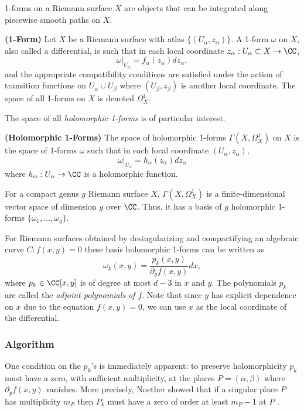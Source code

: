 1-forms on a Riemann surface $X$ are objects that can be integrated
along piecewise smooth paths on $X$.
\begin{definition}
  {\bf (1-Form)} Let $X$ be a Riemann surface with atlas $\{ (U_\alpha,
  z_\alpha) \}$. A 1-form $\omega$ on $X$, also called a differential,
  is such that in each local coordinate $z_\alpha : U_\alpha \subset X
  \to \CC$,
  \[
      \omega \Big|_{U_\alpha} = f_\alpha(z_\alpha) dz_\alpha,
  \]
  and the appropriate compatibility conditions are satisfied under the
  action of transition functions on $U_\alpha \cup U_\beta$ where
  $(U_\beta, z_\beta)$ is another local coordinate. The space of all
  1-forms on $X$ is denoted $\Omega_X^1$.
\end{definition}
The space of all {\it holomorphic 1-forms} is of particular interest.
\begin{definition}
  {\bf (Holomorphic 1-Forms)} The space of holomorphic 1-forms
  $\Gamma(X,\Omega_X^1)$ on $X$ is the space of 1-forms $\omega$ such
  that in each local coordinate $(U_\alpha, z_\alpha)$,
  \[
      \omega \Big|_{U_\alpha} = h_\alpha(z_\alpha) dz_\alpha
  \]
  where $h_\alpha : U_\alpha \to \CC$ is a holomorphic function.
\end{definition}
For a compact genus $g$ Riemann surface $X$, $\Gamma(X,\Omega_X^1)$ is a
finite-dimensional vector space of dimension $g$ over $\CC$. Thus, it
has a basis of $g$ holomorphic 1-forms $\{\omega_1, \ldots, \omega_g\}$.

For Riemann surfaces obtained by desingularizing and compactifying an
algebraic curve $C : f(x,y) = 0$ these basis holomorphic 1-forms can be
written as
\begin{equation*}
  \omega_k(x,y) = \frac{p_k(x,y)}{\partial_y f(x,y)} dx,
\end{equation*}
where $p_k \in \CC[x,y]$ is of degree at most $d-3$ in $x$ and $y$. The
polynomials $p_k$ are called the {\it adjoint polynomials of $f$}. Note
that since $y$ has explicit dependence on $x$ due to the equation
$f(x,y) = 0$, we can use $x$ as the local coordinate of the
differential.

%
\subsubsection*{Algorithm}
%

One condition on the $p_k$'s is immediately apparent: to preserve
holomorphicity $p_k$ must have a zero, with sufficient multiplicity, at
the places $P = (\alpha,\beta)$ where $\partial_y f(x,y)$ vanishes. More
precisely, Noether showed that if a singular place $P$ has multiplicity
$m_P$ then $P_k$ must have a zero of order at least $m_P - 1$ at $P$
\cite{Noether83}.

